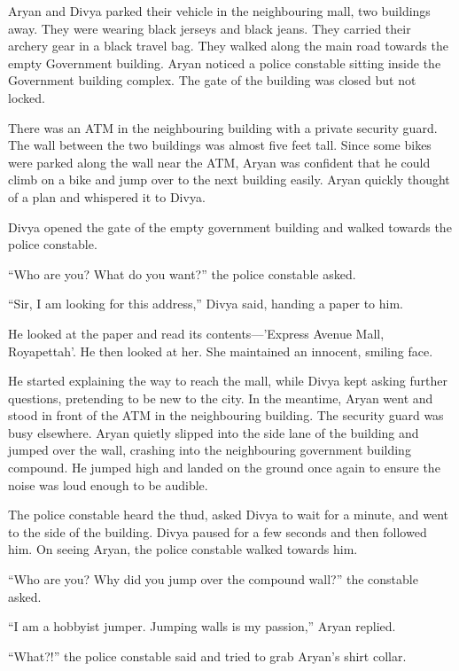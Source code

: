 Aryan and Divya parked their vehicle in the neighbouring mall, two buildings
away. They were wearing black jerseys and black jeans. They carried their
archery gear in a black travel bag. They walked along the main road towards the
empty Government building. Aryan noticed a police constable sitting inside the
Government building complex. The gate of the building was closed but not locked.

There was an ATM in the neighbouring building with a private security guard. The
wall between the two buildings was almost five feet tall. Since some bikes were
parked along the wall near the ATM, Aryan was confident that he could climb on a
bike and jump over to the next building easily. Aryan quickly thought of a plan
and whispered it to Divya.

Divya opened the gate of the empty government building and walked towards the
police constable.

“Who are you? What do you want?” the police constable asked.

“Sir, I am looking for this address,” Divya said, handing a paper to him.

He looked at the paper and read its contents—'Express Avenue Mall,
Royapettah'. He then looked at her. She maintained an innocent, smiling face.

He started explaining the way to reach the mall, while Divya kept asking further
questions, pretending to be new to the city. In the meantime, Aryan went and
stood in front of the ATM in the neighbouring building. The security guard was
busy elsewhere. Aryan quietly slipped into the side lane of the building and
jumped over the wall, crashing into the neighbouring government building compound.
He jumped high and landed on the ground once again to ensure the noise was
loud enough to be audible.

The police constable heard the thud, asked Divya to wait for a minute, and went
to the side of the building. Divya paused for a few seconds and then followed
him. On seeing Aryan, the police constable walked towards him.

“Who are you? Why did you jump over the compound wall?” the constable asked.

“I am a hobbyist jumper. Jumping walls is my passion,” Aryan replied.

“What?!” the police constable said and tried to grab Aryan's shirt collar.

